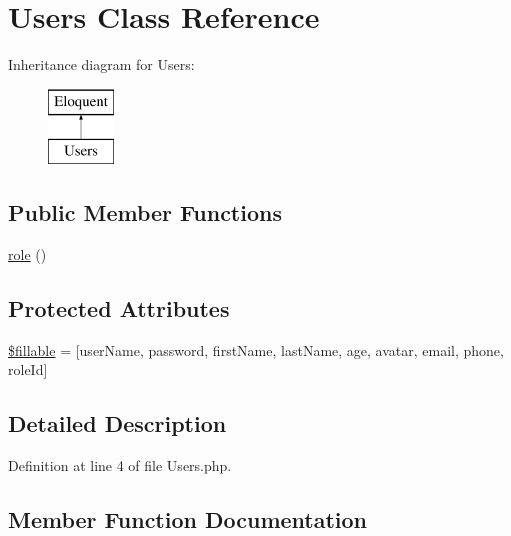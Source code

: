 \hypertarget{class_users}{}\section{Users Class Reference}
\label{class_users}
Inheritance diagram for Users\+:\begin{figure}[H]
\begin{center}
\leavevmode
\includegraphics[height=2.000000cm]{class_users}
\end{center}
\end{figure}
\subsection*{Public Member Functions}
\begin{DoxyCompactItemize}
\item 
\hyperlink{class_users_a4a492898ef6d04f34f38e12fab5dcf57}{role} ()
\end{DoxyCompactItemize}
\subsection*{Protected Attributes}
\begin{DoxyCompactItemize}
\item 
\hyperlink{class_users_a6a90e74ccdf5efd70d51d10c906f8e32}{\$fillable} = \mbox{[}\textquotesingle{}user\+Name\textquotesingle{}, \textquotesingle{}password\textquotesingle{}, \textquotesingle{}first\+Name\textquotesingle{}, \textquotesingle{}last\+Name\textquotesingle{}, \textquotesingle{}age\textquotesingle{}, \textquotesingle{}avatar\textquotesingle{}, \textquotesingle{}email\textquotesingle{}, \textquotesingle{}phone\textquotesingle{}, \textquotesingle{}role\+Id\textquotesingle{}\mbox{]}
\end{DoxyCompactItemize}


\subsection{Detailed Description}


Definition at line 4 of file Users.\+php.



\subsection{Member Function Documentation}
\hypertarget{class_users_a4a492898ef6d04f34f38e12fab5dcf57}{}\label{class_users_a4a492898ef6d04f34f38e12fab5dcf57} 
